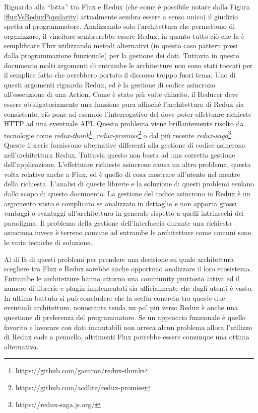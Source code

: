 Riguardo alla “lotta” tra Flux e Redux (che come è possibile notare dalla Figura \ref{fluxVsReduxPopularity} attualmente sembra essere a senso unico) il giudizio spetta al programmatore. Analizzando solo l'architettura che permettono di organizzare, il vincitore sembrerebbe essere Redux, in quanto tutto ciò che fa è semplificare Flux utilizzando metodi alternativi (in questo caso pattern presi dalla programmazione funzionale) per la gestione dei dati. Tuttavia in questo documento molti argomenti di entrambe le architetture non sono stati toccati per il semplice fatto che avrebbero portato il discorso troppo fuori tema.
Uno di questi argomenti riguarda Redux, ed è la gestione di codice asincrono all'esecuzione di una Action. Come è stato più volte chiarito, il Reducer deve essere obbligatoriamente una funzione pura affinché l'architettura di Redux sia consistente, ciò pone ad esempio l'interrogativo del dove poter effettuare richieste HTTP ad una eventuale API. Questo problema viene brillantemente risolto da tecnologie come \textit{redux-thunk}\footnote{https://github.com/gaearon/redux-thunk}, \textit{redux-promise}\footnote{https://github.com/acdlite/redux-promise} o dal più recente \textit{redux-saga}\footnote{https://redux-saga.js.org/}. Queste librerie forniscono alternative differenti alla gestione di codice asincrono nell'architettura Redux. Tuttavia questo non basta ad una corretta gestione dell'applicazione. L'effettuare richieste asincrone causa un altro problema, questa volta relativo anche a Flux, ed è quello di cosa mostrare all'utente nel mentre della richiesta. L'analisi di queste librerie e la soluzione di questi problemi esulano dallo scopo di questo documento. La gestione del codice asincrono in Redux è un argomento vasto e complicato se analizzato in dettaglio e non apporta grossi vantaggi o svantaggi all'architettura in generale rispetto a quelli intrinsechi del paradigma. Il problema della gestione dell'interfaccia durante una richiesta asincrona invece è terreno comune ad entrambe le architetture come comuni sono le varie tecniche di soluzione.

Al di là di questi problemi per prendere una decisione su quale architettura scegliere tra Flux e Redux sarebbe anche opportuno analizzare il loro ecosistema. Entrambe le architetture hanno attorno una community piuttosto attiva ed il numero di librerie e plugin implementati sia ufficialmente che dagli utenti è vasto.
In ultima battuta si può concludere che la scelta concreta tra queste due eventuali architetture, nonostante tenda un po' più verso Redux è anche una questione di preferenza del programmatore. Se un approccio funzionale è quello favorito e lavorare con dati immutabili non arreca alcun problema allora l'utilizzo di Redux cade a pennello, altrimenti Flux potrebbe essere comunque una ottima alternativa.